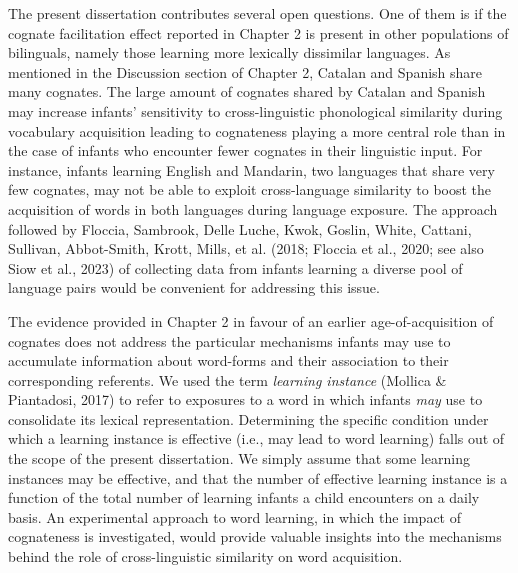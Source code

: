 \documentclass[
  12pt,
  b5paperpaper,
  twoside]{scrreprt}
\begin{document}
The present dissertation contributes several open questions. One of them
is if the cognate facilitation effect reported in Chapter 2 is present
in other populations of bilinguals, namely those learning more lexically
dissimilar languages. As mentioned in the Discussion section of Chapter
2, Catalan and Spanish share many cognates. The large amount of cognates
shared by Catalan and Spanish may increase infants' sensitivity to
cross-linguistic phonological similarity during vocabulary acquisition
leading to cognateness playing a more central role than in the case of
infants who encounter fewer cognates in their linguistic input. For
instance, infants learning English and Mandarin, two languages that
share very few cognates, may not be able to exploit cross-language
similarity to boost the acquisition of words in both languages during
language exposure. The approach followed by Floccia, Sambrook, Delle
Luche, Kwok, Goslin, White, Cattani, Sullivan, Abbot-Smith, Krott,
Mills, et al. (2018; Floccia et al., 2020; see also Siow et al., 2023)
of collecting data from infants learning a diverse pool of language
pairs would be convenient for addressing this issue.

The evidence provided in Chapter 2 in favour of an earlier
age-of-acquisition of cognates does not address the particular
mechanisms infants may use to accumulate information about word-forms
and their association to their corresponding referents. We used the term
\emph{learning instance} (Mollica \& Piantadosi, 2017) to refer to
exposures to a word in which infants \emph{may} use to consolidate its
lexical representation. Determining the specific condition under which a
learning instance is effective (i.e., may lead to word learning) falls
out of the scope of the present dissertation. We simply assume that some
learning instances may be effective, and that the number of effective
learning instance is a function of the total number of learning infants
a child encounters on a daily basis. An experimental approach to word
learning, in which the impact of cognateness is investigated, would
provide valuable insights into the mechanisms behind the role of
cross-linguistic similarity on word acquisition.
\end{document}
